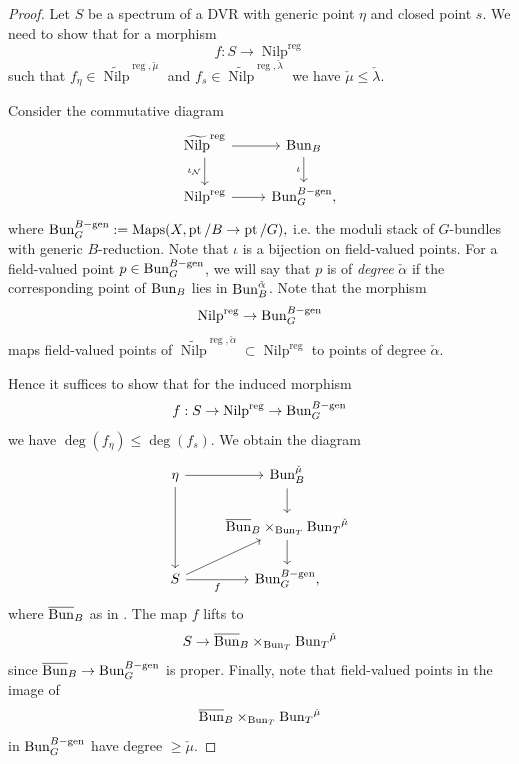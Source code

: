 \documentclass[9pt]{amsart}
\DeclareMathOperator{\pt}{{pt}}
\DeclareMathOperator{\reg}{{reg}}
\newcommand{\cN}{{\mathcal N}}
\DeclareMathOperator{\Maps}{{Maps}}
\DeclareMathOperator{\Nilp}{{Nilp}} \DeclareMathOperator{\op}{{op}}
\numberwithin{equation}{section}
\begin{document}
\begin{proof}
	Let $S$ be a spectrum of a DVR with generic point $\eta$ and closed point $s$. We need to show that for a morphism 
	$$f: S \rightarrow {\Nilp}^{\reg}$$ such that 
	$f_{\eta} \in \widetilde{\Nilp}^{\reg, \check{\mu}}$ and $f_s \in \widetilde{\Nilp}^{\reg, \check{\lambda}}$ we have $\check{\mu} \leq \check{\lambda}$.
	
	Consider the commutative diagram 
		\[
	\begin{tikzcd}
	\widetilde{\Nilp}^{\reg}\ar[r, rightarrow, ""']\ar[d, rightarrow, "\iota_{\cN}"']&   	\Bun_B \ar[d, rightarrow, "\iota"']  \\
	{\Nilp}^{\reg}\ar[r, rightarrow, ""']&  \Bun_G^{B-\operatorname{gen}},
	\end{tikzcd}
	\]
	where $\Bun_G^{B-\operatorname{gen}} := \Maps(X, \pt/B \rightarrow \pt/G),$ i.e. the moduli stack of $G$-bundles with generic $B$-reduction. Note that $\iota$ is a bijection on field-valued points. For a field-valued point $p \in \operatorname{{Bun}}_G^{B-\operatorname{gen}}$, we will say that $p$ is of {\it degree} $\check{\alpha}$ if the corresponding point of $\operatorname{{Bun}}_B$ lies in $\operatorname{{Bun}}_B^{\check{\alpha}}$. Note that the morphism $${\Nilp}^{\reg} \rightarrow \Bun_G^{B-\operatorname{gen}}$$ maps field-valued points of $\widetilde{\Nilp}^{\reg, \check{\alpha}} \subset {\Nilp}^{\reg}$ to points of degree $ \check{\alpha}$.
	
	Hence it suffices to show that for the induced morphism 
	$$f: S \rightarrow {\Nilp}^{\reg} \rightarrow \Bun_G^{B-\operatorname{gen}}$$
	we have $\deg(f_{\eta}) \leq \deg(f_s)$. We obtain the diagram 
		\[
	\begin{tikzcd}
	\eta \ar[r, rightarrow, ""']\ar[dd, rightarrow, ""'] & \Bun_B^{\check{\mu}} \ar[d, rightarrow, ""']\\
		&   	\overline{\Bun}_B \times_{\Bun_T} {\Bun_T}^{\check{\mu}} \ar[d, rightarrow, ""']  \\
	S\ar[r, rightarrow, "f"'] \ar[ru, rightarrow, ""']&  \Bun_G^{B-\operatorname{gen}},
	\end{tikzcd}
	\]
	where $\overline{\operatorname{{Bun}}}_B$ as in \cite[1.2.1]{BG}. The map $f$ lifts to $$S \rightarrow \overline{\operatorname{{Bun}}}_B \times_{\operatorname{{Bun}}_T} {\operatorname{{Bun}}_T}^{\check{\mu}}$$ since $\overline{\operatorname{{Bun}}}_B \rightarrow \operatorname{{Bun}}_G^{B-\operatorname{gen}}$ is proper. Finally, note that field-valued points in the image of $$	\overline{\operatorname{{Bun}}}_B \times_{\operatorname{{Bun}}_T} {\operatorname{{Bun}}_T}^{\check{\mu}}$$ in $\operatorname{{Bun}}_G^{B-\operatorname{gen}}$ have degree $\geq \check{\mu}.$
\end{proof}
\end{document}
